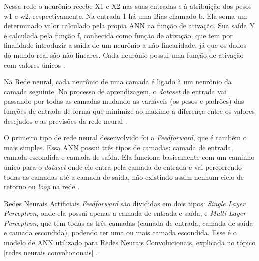 \begin{figure}[H]
	\centering
\end{figure}

Nessa rede o neurônio recebe X1 e X2 nas suas entradas e à atribuição dos pesos w1 e w2, respectivamente. Na entrada 1 há uma Bias chamado b. Ela soma um determinado valor calculado pela propia ANN na função de ativação. Sua saída Y é calculada pela função f, conhecida como função de ativação, que tem por finalidade introduzir a saída de um neurônio a não-linearidade, já que os dados do mundo real são não-lineares. Cada neurônio possui uma função de ativação com valores únicos \cite{conv2}.

Na Rede neural, cada neurônio de uma camada é ligado à um neurônio da camada seguinte. No processo de aprendizagem, o \textit{dataset} de entrada vai passando por todas as camadas mudando as variáveis (os pesos e padrões) das funções de entrada de forma que minimize ao máximo a diferença entre os valores desejados e as previsões da rede neural \cite{redeneuralnvidia}.

O primeiro tipo de rede neural desenvolvido foi a \textit{Feedforward}, que é também o mais simples. Essa ANN possui três tipos de camadas: camada de entrada, camada escondida e camada de saída. Ela funciona basicamente com um caminho único para o \textit{dataset} onde ele entra pela camada de entrada e vai percorrendo todas as camadas até a camada de saída, não existindo assim nenhum ciclo de retorno ou \textit{loop} na rede \cite{conv2, redeneuralnvidia}.

Redes Neurais Artificiais \textit{Feedforward} são divididas em dois tipos: \textit{Single Layer Perceptron}, onde ela possui apenas a camada de entrada e saída, e \textit{Multi Layer Perceptron}, que tem todas as três camadas (camada de entrada, camada de saída e camada escondida), podendo ter uma ou mais camada escondida. Esse é o modelo de ANN utilizado para Redes Neurais Convolucionais, explicada no tópico \ref{redes neurais convolucionais} \cite{redeneuralnvidia}.

